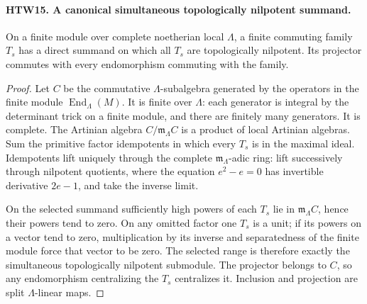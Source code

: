 \paragraph{HTW15. A canonical simultaneous topologically nilpotent summand.}
\label{claim:HTW15}
On a finite module over complete noetherian local \(\Lambda\),
a finite commuting family \(T_s\) has a direct summand
on which all \(T_s\) are topologically nilpotent.
Its projector commutes with every endomorphism commuting
with the family.
\begin{proof}
Let \(C\) be the commutative \(\Lambda\)-subalgebra generated
by the operators in the finite module
\(\operatorname{End}_\Lambda(M)\).  It is finite over
\(\Lambda\): each generator is integral by the determinant
trick on a finite module, and there are finitely many
generators.  It is complete.  The Artinian algebra
\(C/\mathfrak m_\Lambda C\) is a product of local
Artinian algebras.  Sum the primitive factor idempotents
in which every \(T_s\) is in the maximal ideal.
Idempotents lift uniquely through the complete
\(\mathfrak m_\Lambda\)-adic ring: lift successively
through nilpotent quotients, where the equation
\(e^2-e=0\) has invertible derivative \(2e-1\), and
take the inverse limit.

On the selected summand sufficiently high powers of
each \(T_s\) lie in \(\mathfrak m_\Lambda C\), hence
their powers tend to zero.  On any omitted factor
one \(T_s\) is a unit; if its powers on a vector tend
to zero, multiplication by its inverse and separatedness
of the finite module force that vector to be zero.
The selected range is therefore exactly the
simultaneous topologically nilpotent submodule.
The projector belongs to \(C\), so any endomorphism
centralizing the \(T_s\) centralizes it.  Inclusion
and projection are split \(\Lambda\)-linear maps.
\end{proof}

